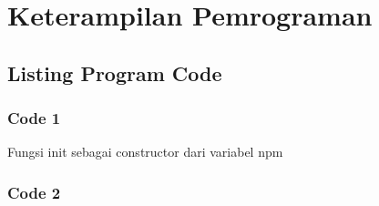 \chapter{Keterampilan Pemrograman}

\section{Listing Program Code}

\subsection{Code 1}
Fungsi init sebagai constructor dari variabel npm
























\subsection{Code 2}
